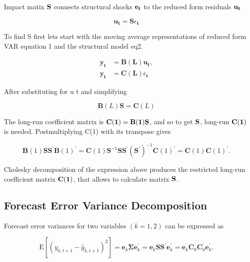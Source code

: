 \documentclass[a4paper,12pt]{article}
\begin{document}
Impact matix \(\bf S\) connects structural shocks \(\bf e_t\) to the reduced form residuals \(\bf u_t\)

\begin{equation} \label{eq:8}
		\mathbf{u}_{\mathbf{t}}=\mathbf{S} \epsilon_{\mathbf{t}}
\end{equation}

To find S first lets start with the moving average representations of reduced form VAR equation 1 and the structural model eq2.

\begin{equation} \label{eq:9}
\begin{split}
		\mathbf{y}_{\mathbf{t}} &=\mathbf{B}(\mathbf{L}) \mathbf{u}_{\mathbf{t}}, \\
		\mathbf{y}_{\mathbf{t}} &=\mathbf{C}(\mathbf{L}) \epsilon_{\mathbf{t}}
\end{split}
\end{equation}

After substituting for u t and simplifying

\begin{equation} \label{eq:10}
		\mathbf{B}(L) \mathbf{S}=\mathbf{C}(L)
\end{equation}

The long-run coefficient matrix is \(\bf C(1) = B(1)S\), and so to get \(\bf S\), long-run \(\bf C(1)\) is needed. Postmultiplying C(1) with its transpose gives

\begin{equation} \label{eq:11}
		\mathbf{B}(1) \mathbf{S S}^{\prime} \mathbf{B}(1)^{\prime}=\mathbf{C}(1) \mathbf{S}^{-1} \mathbf{S} \mathbf{S}^{\prime}\left(\mathbf{S}^{\prime}\right)^{-1} \mathbf{C}(1)^{\prime}=\mathbf{C}(1) \mathbf{C}(1)^{\prime}.
\end{equation}

Cholesky decomposition of the expression above produces the restricted long-run coefficient matrix \(\bf C(1)\), that allows to calculate matrix \(\bf S\).

\subsection{Forecast Error Variance Decomposition}

Forecast error variances for two variables \((k=1,2)\) can be expressed as

\begin{equation} \label{eq:12}
		\mathrm{E}\left[\left(y_{k, t+1}-\hat{y}_{k, t+1}\right)^{2}\right]=\mathbf{e}_{k} \mathbf{\Sigma} \mathbf{e}_{k}^{\prime}=\mathbf{e}_{k} \mathbf{S S}^{\prime} \mathbf{e}_{k}^{\prime}=\mathbf{e}_{k} \mathbf{C}_{0} \mathbf{C}_{0}^{\prime} \mathbf{e}_{k}^{\prime}.
\end{equation}
\end{document}
